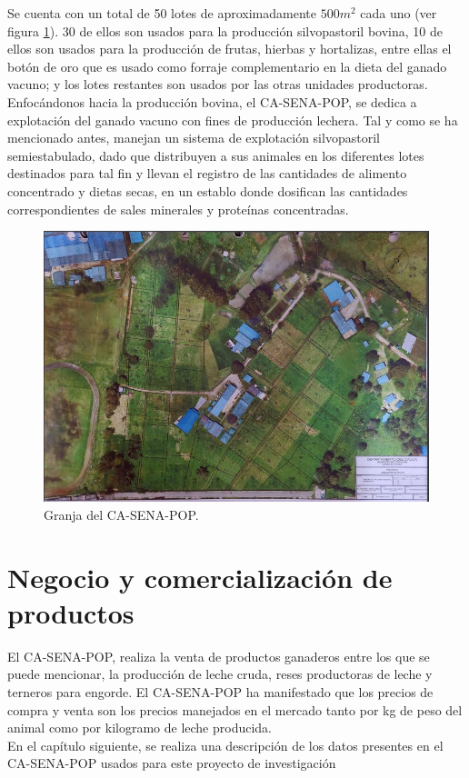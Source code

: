 Se cuenta con un total de 50 lotes de aproximadamente $500m^{2}$ cada uno (ver figura \ref{potrerosenapng}). 30 de ellos son usados para la producción silvopastoril bovina, 10 de ellos son usados para la producción de frutas, hierbas y hortalizas, entre ellas el botón de oro que es usado como forraje complementario en la dieta del ganado vacuno; y los lotes restantes son usados por las otras unidades productoras. Enfocándonos hacia la producción bovina, el CA-SENA-POP, se dedica a explotación del ganado vacuno con fines de producción lechera. Tal y como se ha mencionado antes, manejan un sistema de explotación silvopastoril semiestabulado, dado que distribuyen a sus animales en los diferentes lotes destinados para tal fin y llevan el registro de las cantidades de alimento concentrado y dietas secas, en un establo donde dosifican las cantidades correspondientes de sales minerales y proteínas concentradas.\\

\begin{figure}[H]
	 \begin{center}
	 \includegraphics[scale=0.675]{img/potrerosena.jpg}
	 \end{center}
	 \caption{Granja del CA-SENA-POP. \label{potrerosenapng}}
	\end{figure}
	
\section{Negocio y comercialización de productos}

El CA-SENA-POP, realiza la venta de productos ganaderos entre los que se puede mencionar, la producción de leche cruda, reses productoras de leche y terneros para engorde. El CA-SENA-POP ha manifestado que los precios de compra y venta son los precios manejados en el mercado tanto por kg de peso del animal como por kilogramo de leche producida.\\


En el capítulo siguiente, se realiza una descripción de los datos presentes en el CA-SENA-POP usados para este proyecto de investigación


